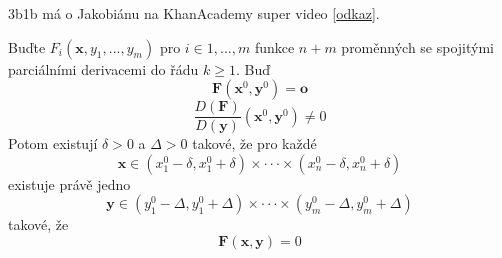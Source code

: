 \documentclass[../main.tex]{subfiles}
\begin{document}
\begin{remark}
	3b1b má o Jakobiánu na KhanAcademy super video [\href{https://www.khanacademy.org/math/multivariable-calculus/multivariable-derivatives/jacobian/v/the-jacobian-matrix}{odkaz}].
\end{remark}

\begin{theorem}
	Buďte $F_i(\mathbf{x}, y_1, ... , y_m)$ pro $i \in {1, ... , m}$ funkce $n+m$ proměnných se spojitými
	parciálními derivacemi do řádu $k \geq 1$. Buď \[ \mathbf{F}(\mathbf{x}^0, \mathbf{y}^0) = \mathbf{o} \]
	\[ \frac{D(\mathbf{F})}{D(\mathbf{y})}(\mathbf{x}^0, \mathbf{y}^0) \neq 0 \]
	Potom existují $\delta > 0$ a $\Delta > 0$ takové, že pro každé
	\[ \mathbf{x} \in (x_{1}^{0} - \delta, x_{1}^{0} + \delta) \times \cdot \cdot \cdot \times 
	(x_{n}^{0} - \delta, x_{n}^{0} + \delta)\]
	existuje právě jedno
	\[ \mathbf{y} \in (y_{1}^{0} - \Delta , y_{1}^{0} + \Delta) \times \cdot \cdot \cdot \times
	(y_{m}^{0} - \Delta , y_{m}^{0} + \Delta) \]
	takové, že
	\[ \mathbf{F}(\mathbf{x}, \mathbf{y}) = 0 \]
\end{theorem}

\end{document}
